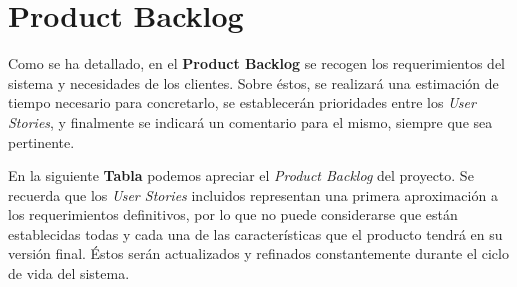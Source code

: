 \section{Product Backlog}

Como se ha detallado, en el \textbf{Product Backlog} se recogen los requerimientos del sistema y necesidades de los clientes.
Sobre éstos, se realizará una estimación de tiempo necesario para concretarlo, se establecerán prioridades entre los \textit{User Stories}, y finalmente se indicará un comentario para el mismo, siempre que sea pertinente.

En la siguiente \textbf{Tabla} podemos apreciar el \textit{Product Backlog} del proyecto.
Se recuerda que los \textit{User Stories} incluidos representan una primera aproximación a los requerimientos definitivos, por lo que no puede considerarse que están establecidas todas y cada una de las características que el producto tendrá en su versión final.
Éstos serán actualizados y refinados constantemente durante el ciclo de vida del sistema.


